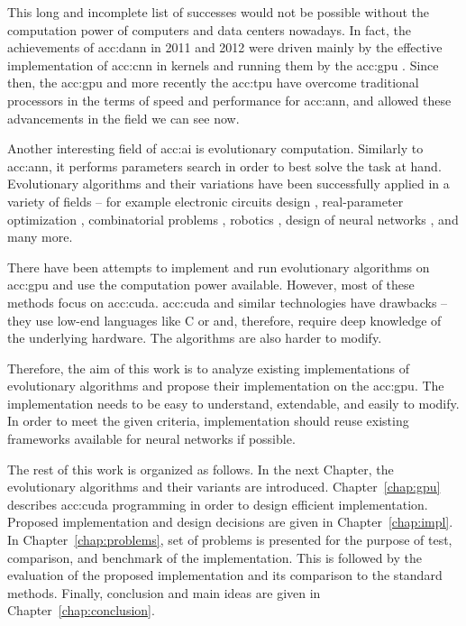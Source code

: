 This long and incomplete list of successes would not be possible without the computation power of computers and data centers nowadays. In fact, the achievements of \acrshort{acc:dann} in 2011 and 2012 were driven mainly by the effective implementation of \acrfull{acc:cnn} in kernels and running them by the \acrfull{acc:gpu} \citep{CIRESAN2012333}. Since then, the \acrshort{acc:gpu} and more recently the \acrfull{acc:tpu} have overcome traditional processors in the terms of speed and performance for \acrshort{acc:ann}, and allowed these advancements in the field we can see now.

Another interesting field of \acrlong{acc:ai} is evolutionary computation. Similarly to \acrshort{acc:ann}, it performs parameters search in order to best solve the task at hand. Evolutionary algorithms and their variations have been successfully applied in a variety of fields -- for example 
electronic circuits design \citep{NASAantenaDesign}\allowbreak\citep{circuitdesignoptimizationea},
real-parameter optimization \citep{IntroNaturalEvolutionStrategies}, 
combinatorial problems \citep{GeneticAssambleLineBalancingProblem}\allowbreak\citep{ALBAYRAK20111313},\linebreak
robotics \citep{EvolutionaryRobotics}\allowbreak\citep{RoboticsInPhysX}\allowbreak\citep{nygaard2018realworld},
design of neural networks \citep{NEAT}\allowbreak\citep{Floreano2008NeuroevolutionFA},
and many more.

There have been attempts to implement and run evolutionary algorithms on \acrshort{acc:gpu} \citep{CHENG2019514} and use the computation power available. However, most of these methods focus on \acrfull{acc:cuda}. \acrshort{acc:cuda} and similar technologies have drawbacks -- they use low-end languages like C or \cpp and, therefore, require deep knowledge of the underlying hardware. The algorithms are also harder to modify.

Therefore, the aim of this work is to analyze existing implementations of evolutionary algorithms and propose their implementation on the \acrshort{acc:gpu}. The implementation needs to be easy to understand, extendable, and easily to modify. In order to meet the given criteria, implementation should reuse existing frameworks available for neural networks if possible.

The rest of this work is organized as follows. 
In the next Chapter, the evolutionary algorithms and their variants are introduced. 
Chapter~\ref{chap:gpu} describes \acrshort{acc:cuda} programming in order to  design efficient implementation.
Proposed implementation and design decisions are given in Chapter~\ref{chap:impl}. 
In Chapter~\ref{chap:problems}, set of problems is presented for the purpose of test, comparison, and benchmark of the implementation. This is followed by the evaluation of the proposed implementation and its comparison to the standard methods.
Finally, conclusion and main ideas are given in Chapter~\ref{chap:conclusion}.
